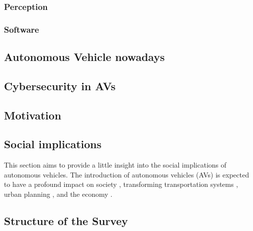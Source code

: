 \subsubsection{Perception}\label{subsubsec:perception}
\subsubsection{Software}\label{subsubsec:software}

\subsection{Autonomous Vehicle nowadays}\label{subsec:autonomous-vehicles-nowadays}

\subsection{Cybersecurity in AVs}\label{subsec:cybersecurity-in-avs}

\subsection{Motivation}\label{subsec:motivation}

\subsection{Social implications}\label{subsec:social-implications}

This section aims to provide a little insight into the social implications of autonomous vehicles.
The introduction of autonomous vehicles (AVs) is expected to have a profound impact on society \cite{thomas2020perception}, transforming transportation systems \cite{intelligent_transportation_2023}
, urban planning \cite{impact_autonomous_vehicles_2018}, and the economy \cite{economic_aspects_2020}.

\subsection{Structure of the Survey}\label{subsec:structure-of-the-survey}
